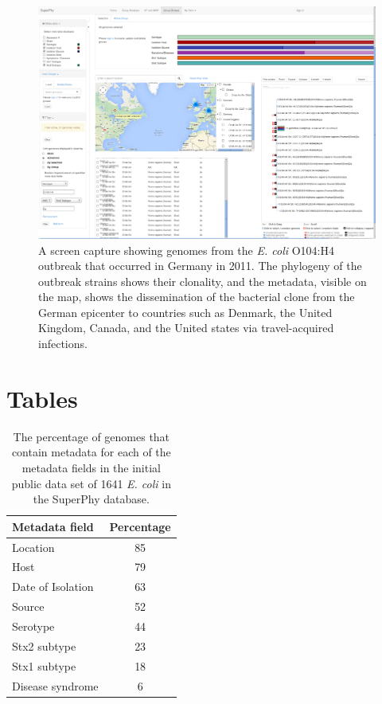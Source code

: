 \documentclass[doublespacing, linenumbers]{bmcart}
\begin{document}
\begin{backmatter}
\newpage
\begin{landscape}
\begin{figure}[h!]
  \includegraphics[width=0.95\columnwidth]{images/o104_clade.png}
  \caption{A screen capture showing genomes from the \textit{E. coli} O104:H4 outbreak that occurred in Germany in 2011. The phylogeny of the outbreak strains shows their clonality, and the metadata, visible on the map, shows the dissemination of the bacterial clone from the German epicenter to countries such as Denmark, the United Kingdom, Canada, and the United states via travel-acquired infections.}
  \label{fig:o104_clade}
\end{figure}
\end{landscape}

\newpage
\section*{Tables}
\begin{table}[h!]
\caption{The percentage of genomes that contain metadata for each of the metadata fields in the initial public data set of 1641 \textit{E. coli} in the SuperPhy database.}
\label{tab:metadata}
      \begin{tabular}{lc}
        \hline
        Metadata field & Percentage\\ 
        \hline
        Location & 85\\
        Host & 79\\
        Date of Isolation & 63\\
        Source & 52\\
        Serotype & 44\\
        Stx2 subtype & 23\\
        Stx1 subtype & 18\\
        Disease syndrome & 6\\ 
        \hline
      \end{tabular}
\end{table}


\end{backmatter}
\end{document}
